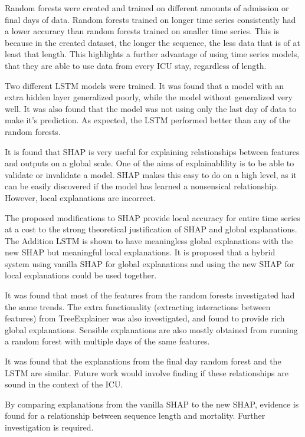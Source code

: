 \documentclass[12pt]{article}
\begin{document}
Random forests were created and trained on different amounts of admission or final days of data. Random forests trained on longer time series consistently had a lower accuracy than random forests trained on smaller time series. This is because in the created dataset, the longer the sequence, the less data that is of at least that length. This highlights a further advantage of using time series models, that they are able to use data from every ICU stay, regardless of length.

Two different LSTM models were trained. It was found that a model with an extra hidden layer generalized poorly, while the model without generalized very well. It was also found that the model was not using only the last day of data to make it's prediction. As expected, the LSTM performed better than any of the random forests. 

It is found that SHAP is very useful for explaining relationships between features and outputs on a global scale. One of the aims of explainablility is to be able to validate or invalidate a model. SHAP makes this easy to do on a high level, as it can be easily discovered if the model has learned a nonsensical relationship. However, local explanations are incorrect.

The proposed modifications to SHAP provide local accuracy for entire time series at a cost to the strong theoretical justification of SHAP and global explanations. The Addition LSTM is shown to have meaningless global explanations with the new SHAP but meaningful local explanations. It is proposed that a hybrid system using vanilla SHAP for global explanations and using the new SHAP for local explanations could be used together.

It was found that most of the features from the random forests investigated had the same trends. The extra functionality (extracting interactions between features) from TreeExplainer was also investigated, and found to provide rich global explanations. Sensible explanations are also mostly obtained from running a random forest with multiple days of the same features. 

It was found that the explanations from the final day random forest and the LSTM are similar. Future work would involve finding if these relationships are sound in the context of the ICU.

By comparing explanations from the vanilla SHAP to the new SHAP, evidence is found for a relationship between sequence length and mortality. Further investigation is required.
\end{document}
